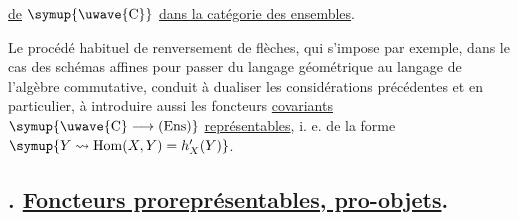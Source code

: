 \uline{de} $\symup{\text{\uwave{C}}}$ \uline{dans la catégorie des ensembles}.

Le procédé habituel de renversement de flèches, qui s'impose par exemple, dans
le cas des schémas affines pour passer du langage géométrique au langage de
l'algèbre commutative, conduit à dualiser les considérations précédentes et en
particulier, à introduire aussi les foncteurs \uline{covariants}
$\symup{\text{\uwave{C}}\longrightarrow(\operatorname{Ens})}$ \uline{représentables}, i. e. de la forme
$\symup{Y\rightsquigarrow\operatorname{Hom}(X,Y)=h'_X(Y)}$.

\subsection*{. \uline{Foncteurs proreprésentables, pro-objets}.}


